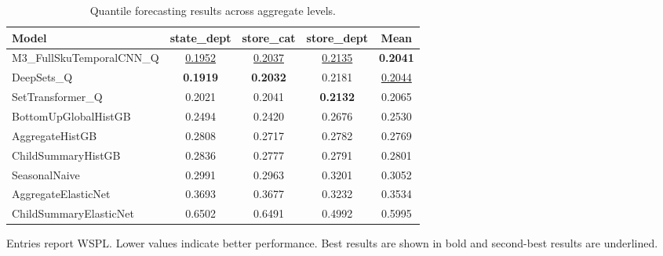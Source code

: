 \begin{table}[H]
\centering
\caption{Quantile forecasting results across aggregate levels.}
\label{tab:main_quantile}
\begin{threeparttable}
\begin{tabular}{lcccc}
\toprule
Model & state\_dept & store\_cat & store\_dept & Mean \\
\midrule
M3\_FullSkuTemporalCNN\_Q & \underline{0.1952} & \underline{0.2037} & \underline{0.2135} & \textbf{0.2041} \\
DeepSets\_Q & \textbf{0.1919} & \textbf{0.2032} & 0.2181 & \underline{0.2044} \\
SetTransformer\_Q & 0.2021 & 0.2041 & \textbf{0.2132} & 0.2065 \\
BottomUpGlobalHistGB & 0.2494 & 0.2420 & 0.2676 & 0.2530 \\
AggregateHistGB & 0.2808 & 0.2717 & 0.2782 & 0.2769 \\
ChildSummaryHistGB & 0.2836 & 0.2777 & 0.2791 & 0.2801 \\
SeasonalNaive & 0.2991 & 0.2963 & 0.3201 & 0.3052 \\
AggregateElasticNet & 0.3693 & 0.3677 & 0.3232 & 0.3534 \\
ChildSummaryElasticNet & 0.6502 & 0.6491 & 0.4992 & 0.5995 \\
\bottomrule
\end{tabular}
\begin{tablenotes}
\footnotesize \item Entries report WSPL. Lower values indicate better performance. Best results are shown in bold and second-best results are underlined.
\end{tablenotes}
\end{threeparttable}
\end{table}
